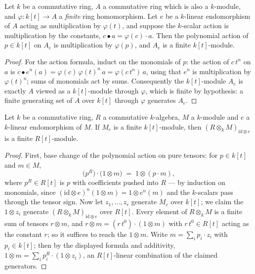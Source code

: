\begin{lemma}
  \label{lem:moduleFinite_aeval_ringHom}
  \leanok
  Let \(k\) be a commutative ring, \(A\) a commutative ring which is also a
  \(k\)-module, and \(\varphi : k[t] \to A\) a \emph{finite} ring homomorphism. Let
  \(e\) be a \(k\)-linear endomorphism of \(A\) acting as multiplication by
  \(\varphi(t)\), and suppose the \(k\)-scalar action is multiplication by the constants,
  \(c \bullet a = \varphi(c) \cdot a\). Then the polynomial action of \(p \in k[t]\) on
  \(A_e\) is multiplication by \(\varphi(p)\), and \(A_e\) is a finite \(k[t]\)-module.
\end{lemma}
\begin{proof}
  \leanok
  For the action formula, induct on the monomials of \(p\): the action of \(c\,t^n\) on
  \(a\) is \(c \bullet e^n(a) = \varphi(c)\,\varphi(t)^n\, a = \varphi(c\,t^n)\, a\),
  using that \(e^n\) is multiplication by \(\varphi(t)^n\); sums of monomials act by
  sums. Consequently the \(k[t]\)-module \(A_e\) is exactly \(A\) viewed as a
  \(k[t]\)-module through \(\varphi\), which is finite by hypothesis: a finite
  generating set of \(A\) over \(k[t]\) through \(\varphi\) generates \(A_e\).
\end{proof}

\begin{theorem}
  \label{thm:moduleFinite_aeval_baseChange}
  \leanok
  Let \(k\) be a commutative ring, \(R\) a commutative \(k\)-algebra, \(M\) a
  \(k\)-module and \(e\) a \(k\)-linear endomorphism of \(M\). If \(M_e\) is a finite
  \(k[t]\)-module, then \((R \otimes_k M)_{\mathrm{id} \otimes e}\) is a finite
  \(R[t]\)-module.
\end{theorem}
\begin{proof}
  \leanok
  First, base change of the polynomial action on pure tensors: for \(p \in k[t]\) and
  \(m \in M\),
  \[
    \bigl(p^R\bigr) \cdot \bigl(1 \otimes m\bigr) \;=\; 1 \otimes (p \cdot m),
  \]
  where \(p^R \in R[t]\) is \(p\) with coefficients pushed into \(R\) --- by induction on
  monomials, since \((\mathrm{id} \otimes e)^n (1 \otimes m) = 1 \otimes e^n(m)\) and
  the \(k\)-scalars pass through the tensor sign. Now let \(z_1, \dots, z_r\) generate
  \(M_e\) over \(k[t]\); we claim the \(1 \otimes z_i\) generate
  \((R \otimes_k M)_{\mathrm{id}\otimes e}\) over \(R[t]\). Every element of
  \(R \otimes_k M\) is a finite sum of tensors \(r \otimes m\), and
  \(r \otimes m = (r\,t^0) \cdot (1 \otimes m)\) with \(r\,t^0 \in R[t]\) acting as the
  constant \(r\); so it suffices to reach the \(1 \otimes m\). Write
  \(m = \sum_i p_i \cdot z_i\) with \(p_i \in k[t]\); then by the displayed formula and
  additivity, \(1 \otimes m = \sum_i p_i^R \cdot (1 \otimes z_i)\), an \(R[t]\)-linear
  combination of the claimed generators.
\end{proof}

